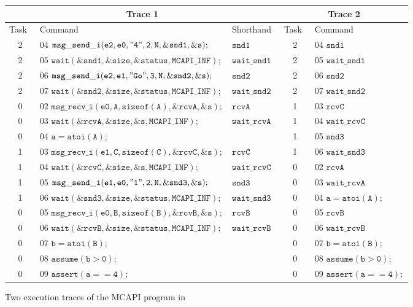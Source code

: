 \begin{figure*}
\begin{center}
\setlength{\tabcolsep}{1pt}
\footnotesize \begin{tabular}[t]{|c|l|l||c|l|}
\hline
\multicolumn{3}{|c||}{Trace 1} & \multicolumn{2}{|c|}{Trace 2}\\
\hline
Task\  & Command\ & Shorthand\ & Task\ & Command\  \\
\hline
2 & 04 $\mathtt{msg\_send\_i(e2,e0,"4",2,N,\&snd1,\&s);}$ & $\mathtt{snd1}$ & 2 & 04 $\mathtt{snd1}$ \\
2 & 05 $\mathtt{wait(\&snd1,\&size,\&status,MCAPI\_INF);}$ & $\mathtt{wait\_snd1}$ & 2 & 05 $\mathtt{wait\_snd1}$ \\
2 & 06 $\mathtt{msg\_send\_i(e2,e1,"Go",3,N,\&snd2,\&s);}$ & $\mathtt{snd2}$ & 2 & 06 $\mathtt{snd2}$ \\
2 & 07 $\mathtt{wait(\&snd2,\&size,\&status,MCAPI\_INF);}$ & $\mathtt{wait\_snd2}$ & 2 & 07 $\mathtt{wait\_snd2}$ \\
0 & 02 $\mathtt{msg\_recv\_i(e0,A,sizeof(A),\&rcvA,\&s);}$ & $\mathtt{rcvA}$ & 1 & 03 $\mathtt{rcvC}$ \\
0 & 03 $\mathtt{wait(\&rcvA,\&size,\&s,MCAPI\_INF);}$ & $\mathtt{wait\_rcvA}$ & 1 & 04 $\mathtt{wait\_rcvC}$ \\
0 & 04 $\mathtt{a = atoi(A);}$ & & 1 & 05 $\mathtt{snd3}$ \\
1 & 03 $\mathtt{msg\_recv\_i(e1,C,sizeof(C),\&rcvC,\&s);}$ & $\mathtt{rcvC}$ & 1 & 06 $\mathtt{wait\_snd3}$ \\
1 & 04 $\mathtt{wait(\&rcvC,\&size,\&s,MCAPI\_INF);}$ & $\mathtt{wait\_rcvC}$ & 0 & 02 $\mathtt{rcvA}$ \\
1 & 05 $\mathtt{msg\_send\_i(e1,e0,"1",2,N,\&snd3,\&s);}$ & $\mathtt{snd3}$ & 0 & 03 $\mathtt{wait\_rcvA}$ \\
1 & 06 $\mathtt{wait(\&snd3,\&size,\&status,MCAPI\_INF);}$ & $\mathtt{wait\_snd3}$ & 0 & 04 $\mathtt{a = atoi(A);}$ \\
0 & 05 $\mathtt{msg\_recv\_i(e0,B,sizeof(B),\&rcvB,\&s);}$ & $\mathtt{rcvB}$ & 0 & 05 $\mathtt{rcvB}$ \\
0 & 06 $\mathtt{wait(\&rcvB,\&size,\&status,MCAPI\_INF);}$ & $\mathtt{wait\_rcvB}$ & 0 & 06 $\mathtt{wait\_rcvB}$ \\
0 & 07 $\mathtt{b = atoi(B);}$ & & 0 & 07 $\mathtt{b = atoi(B);}$ \\
0 & 08 $\mathtt{assume (b > 0);}$ & & 0 & 08 $\mathtt{assume (b > 0);}$ \\
0 & 09 $\mathtt{assert(a == 4);}$ & & 0 & 09 $\mathtt{assert(a == 4);}$ \\
\hline
\end{tabular}
\end{center}
\caption{Two execution traces of the MCAPI program in }
\label{fig:trace}
\end{figure*}

